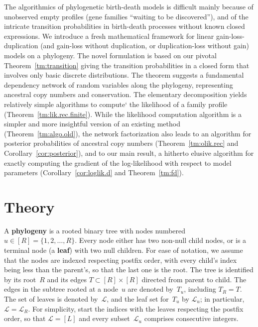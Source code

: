 \documentclass{elsarticle}
\newcommand{\definehere}[1]{\textcolor{webbrown}{\bf #1}}
\newcommand{\nx}{u}
\newcommand{\troot}{R}
\begin{document}
The algorithmics of phylogenetic birth-death models is 
difficult mainly because of unobserved empty profiles 
(gene families ``waiting to be discovered''), and of the intricate transition 
probabilities in birth-death processes without known closed expressions.  
We introduce a fresh mathematical framework for 
linear gain-loss-duplication  (and gain-loss without duplication, or duplication-loss without gain) models on a phylogeny. 
The novel formulation is based on our pivotal Theorem~\ref{tm:transition} 
giving the transition probabilities in a closed form that involves 
only basic discrete distributions.
The theorem suggests a fundamental dependency
network of random variables along the phylogeny, 
representing ancestral copy numbers and conservation. 
The elementary decomposition yields 
relatively simple algorithms to compute`
the likelihood of a family profile (Theorem~\ref{tm:lik.rec.finite}). 
While the likelihood computation algorithm
is a simpler and more insightful version of an existing method
(Theorem~\ref{tm:algo.old}), 
the network factorization 
also leads to an algorithm for posterior probabilities of ancestral copy numbers 
(Theorem~\ref{tm:olik.rec} and Corollary~\ref{cor:posterior}), 
and to our main result, a hitherto elusive
algorithm for exactly computing the gradient of 
the log-likelihood with respect to 
model parameters (Corollary~\ref{cor:loglik.d} and Theorem~\ref{tm:fd}). 


\section{Theory}
A \definehere{phylogeny} is a rooted binary tree 
with nodes numbered $\nx\in [\troot]=\{1,2,\dotsc,\troot\}$.
Every node either has two non-null child nodes, or is a terminal node 
(a \definehere{leaf})
with two null children.   
For ease of notation, we assume that the nodes are indexed respecting postfix order, with
every child's index being less than the parent's, so that
the last one is the root.
The tree is identified by its root~$\troot$ and 
its edges $T\subset [\troot]\times [\troot]$ directed from parent to child. 
The edges in the subtree rooted at a node~$\nx$ are
denoted by~$T_{\nx}$, including $T_{\troot}=T$.  
The set of leaves is denoted by~$\mathcal{L}$, and 
the leaf set for~$T_{\nx}$ by $\mathcal{L}_{\nx}$; 
in particular, $\mathcal{L}=\mathcal{L}_{\troot} $.
For simplicity, 
start the indices with the leaves 
respecting the postfix order,  
so that 
$\mathcal{L}=[L]$ and every subset~$\mathcal{L}_{\nx}$ 
comprises consecutive integers.    
\end{document}
